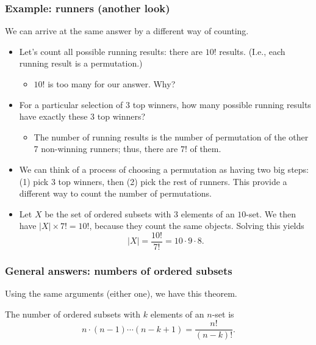 \begin{frame}\frametitle{Example: runners (another look)}
  We can arrive at the same answer by a different way of counting.
  
  \begin{itemize}
  \item Let's count all possible running results: there are $10!$
    results.  (I.e., each running result is a permutation.) \pause
    \begin{itemize}
    \item $10!$ is too many for our answer. Why? \pause
    \end{itemize}
  \item For a particular selection of 3 top winners, how many possible
    running results have exactly these 3 top winners? \pause
    \begin{itemize}
    \item The number of running results is the number of permutation
      of the other 7 non-winning runners; thus, there are $7!$ of
      them.
    \end{itemize}
  \item We can think of a process of choosing a permutation as having
    two big steps: (1) pick 3 top winners, then (2) pick the rest of
    runners.  This provide a different way to count the number of
    permutations.
    \pause
  \item Let $X$ be the set of ordered subsets with $3$ elements of an
    $10$-set.  We then have $|X|\times 7! = 10!$, because they count
    the same objects. \pause  Solving this yields
    \[ |X| = \frac{10!}{7!} = 10\cdot 9\cdot 8.\]
  \end{itemize}
\end{frame}

\begin{frame}\frametitle{General answers: numbers of ordered subsets}
  Using the same arguments (either one), we have this theorem.

  \begin{theorem}
    The number of ordered subsets with $k$ elements of an $n$-set is
    \[
    n\cdot(n-1)\cdots(n - k + 1) = \frac{n!}{(n-k)!}.
    \]
  \end{theorem}
\end{frame}

